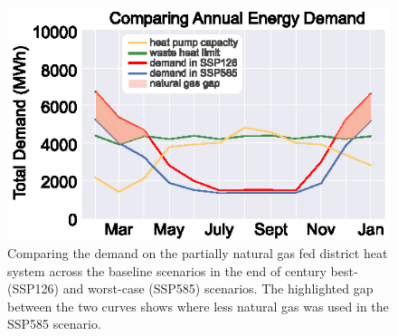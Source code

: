 \documentclass[twocolumn, a4paper,10pt]{article}
\begin{document}
\begin{figure}[h!]
    \centering
    \includegraphics[scale=1.15]{figures/district_heat_charts.eps}
    \caption{Comparing the demand on the partially natural gas fed district heat system across the baseline scenarios in the end of century best- (SSP126) and worst-case (SSP585) scenarios. The highlighted gap between the two curves shows where less natural gas was used in the SSP585 scenario.}
    \label{fig:compare_district}
\end{figure}
\end{document}
